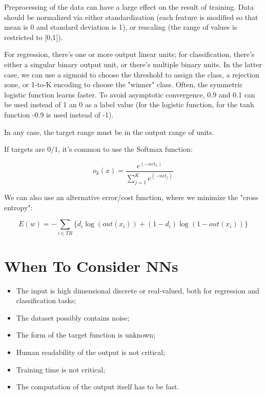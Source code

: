 Preprocessing of the data can have a large effect on the result of training. Data should be normalized via either standardization (each feature is modified so that mean is 0 and standard deviation is 1), or rescaling (the range of values is restricted to [0,1]).

For regression, there's one or more output linear units; for classification, there's either a singular binary output unit, or there's multiple binary units. In the latter case, we can use a sigmoid to choose the threshold to assign the class, a rejection zone, or 1-to-K encoding to choose the "winner" class. Often, the symmetric logistic function learns faster. To avoid asymptotic convergence, 0.9 and 0.1 can be used instead of 1 an 0 as a label value (for the logistic function, for the tanh function -0.9 is used instead of -1).

In any case, the target range must be in the output range of units.

If targets are 0/1, it's common to use the Softmax function:

\begin{equation*}
    o_k(x) = \dfrac{e^{(-net_k)}}{\sum_{j=1}^Ke^{(-net_j)}}
\end{equation*}

We can also use an alternative error/cost function, where we minimize the "cross entropy":

\begin{equation*}
   E(w) = - \sum_{i \in TR} \{ d_i \log (out(x_i)) + (1-d_i) \log(1-out(x_i)) \}
\end{equation*}

\section{When To Consider NNs}

\begin{itemize}
    \item The input is high dimensional discrete or real-valued, both for regression and classification tasks;

    \item The dataset possibly contains noise;

    \item The form of the target function is unknown;

    \item Human readability of the output is not critical;

    \item Training time is not critical;
    
    \item The computation of the output itself has to be fast.
\end{itemize}